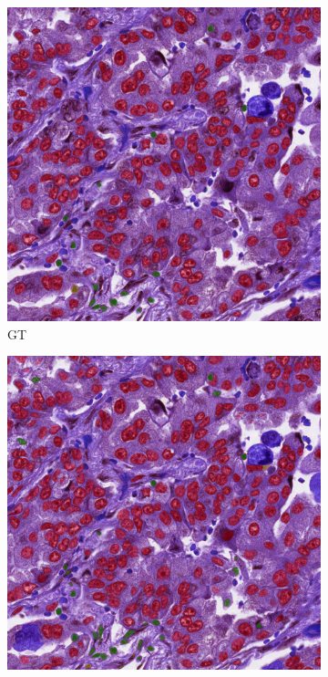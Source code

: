 \begin{figure}[H]
  \centering
  \begin{subfigure}[b]{0.45\textwidth}
    \includegraphics[width=\textwidth]{imgs/qual/monusac/gt3.overlay.png}
    \caption{GT}
    \label{fig:monusac-gt3}
  \end{subfigure}
  \hfill
  \begin{subfigure}[b]{0.45\textwidth}
    \includegraphics[width=\textwidth]{imgs/qual/monusac/hov3.png}

\end{subfigure}
\end{figure}
